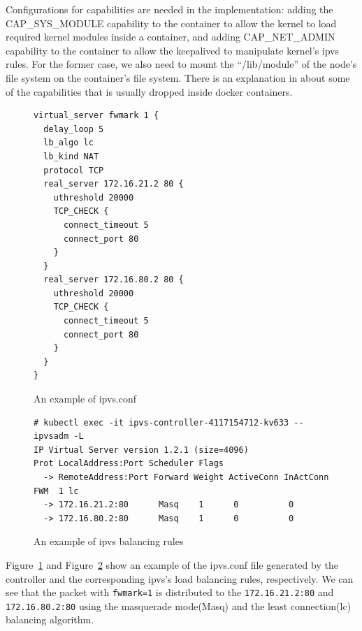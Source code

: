 
Configurations for capabilities are needed in the implementation: adding the CAP\_SYS\_MODULE capability 
to the container to allow the kernel to load required kernel modules inside a container, 
and adding CAP\_NET\_ADMIN capability to the container to allow the keepalived to manipulate kernel’s ipvs rules. 
For the former case, we also need to mount the \enquote{/lib/module} of the node's file system on the container's file system.
There is an explanation in \cite{mp2016enhancing} about some of the capabilities 
that is usually dropped inside docker containers.


\begin{figure}
\begin{minipage}{0.7\columnwidth}
\begin{verbatim}
virtual_server fwmark 1 {
  delay_loop 5
  lb_algo lc
  lb_kind NAT
  protocol TCP
  real_server 172.16.21.2 80 {
    uthreshold 20000
    TCP_CHECK {
      connect_timeout 5
      connect_port 80
    }
  }
  real_server 172.16.80.2 80 {
    uthreshold 20000
    TCP_CHECK {
      connect_timeout 5
      connect_port 80
    }
  }
}
\end{verbatim}
\end{minipage}
\caption{An example of ipvs.conf}
\label{fig:ipvs.conf}
\end{figure}

\begin{figure}
\begin{minipage}{\columnwidth}
\small
\begin{verbatim}
# kubectl exec -it ipvs-controller-4117154712-kv633 -- ipvsadm -L
IP Virtual Server version 1.2.1 (size=4096)
Prot LocalAddress:Port Scheduler Flags
  -> RemoteAddress:Port Forward Weight ActiveConn InActConn
FWM  1 lc
  -> 172.16.21.2:80      Masq    1      0          0         
  -> 172.16.80.2:80      Masq    1      0          0
\end{verbatim}
\end{minipage}
\caption{An example of ipvs balancing rules}
\label{fig:ipvs rule}
\end{figure}


Figure~\ref{fig:ipvs.conf} and Figure~\ref{fig:ipvs rule} show an example of the ipvs.conf file 
generated by the controller and the corresponding ipvs's load balancing rules, respectively.
We can see that the packet with {\tt fwmark=1}\cite{BertHubert2002} is distributed 
to the {\tt 172.16.21.2:80} and {\tt 172.16.80.2:80} 
using the masquerade mode(Masq) and 
the least connection(lc)\cite{Zhang2000} balancing algorithm. 


